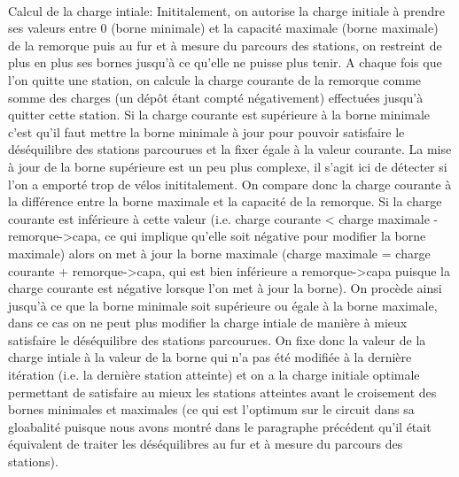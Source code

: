 \documentclass[a4paper, 11pt]{article} %
\begin{document}
\paragraph*{}
Calcul de la charge intiale: Inititalement, on autorise la charge initiale à prendre ses valeurs entre 0 (borne minimale) et la capacité maximale (borne maximale) de la remorque puis au fur et à mesure du parcours des stations, on restreint de plus en plus ses bornes jusqu'à ce qu'elle ne puisse plus tenir. A chaque fois que l'on quitte une station, on calcule la charge courante de la remorque comme somme des charges (un dépôt étant compté négativement) effectuées jusqu'à quitter cette station. Si la charge courante est supérieure à la borne minimale c'est qu'il faut mettre la borne minimale à jour pour pouvoir satisfaire le déséquilibre des stations parcourues et la fixer égale à la valeur courante. La mise à jour de la borne supérieure est un peu plus complexe, il s'agit ici de détecter si l'on a emporté trop de vélos inititalement. On compare donc la charge courante à la différence entre la borne maximale et la capacité de la remorque. Si la charge courante est inférieure à cette valeur (i.e. charge courante < charge maximale - remorque->capa, ce qui implique qu'elle soit négative pour modifier la borne maximale) alors on met à jour la borne maximale (charge maximale = charge courante + remorque->capa, qui est bien inférieure a remorque->capa puisque la charge courante est négative lorsque l'on met à jour la borne). On procède ainsi jusqu'à ce que la borne minimale soit supérieure ou égale à la borne maximale, dans ce cas on ne peut plus modifier la charge intiale de manière à mieux satisfaire le déséquilibre des stations parcourues. On fixe donc la valeur de la charge intiale à la valeur de la borne qui n'a pas été modifiée à la dernière itération (i.e. la dernière station atteinte) et on a la charge initiale optimale permettant de satisfaire au mieux les stations atteintes avant le croisement des bornes minimales et maximales (ce qui est l'optimum sur le circuit dans sa gloabalité puisque nous avons montré dans le paragraphe précédent qu'il était équivalent de traiter les déséquilibres au fur et à mesure du parcours des stations).
\end{document}
